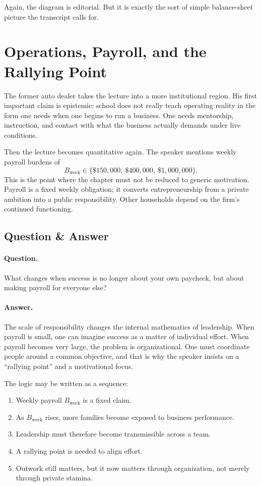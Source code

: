 Again, the diagram is editorial. But it is exactly the sort of simple balance-sheet picture the transcript calls for.

\section{Operations, Payroll, and the Rallying Point}

The former auto dealer takes the lecture into a more institutional region. His first important claim is epistemic: school does not really teach operating reality in the form one needs when one begins to run a business. One needs mentorship, instruction, and contact with what the business actually demands under live conditions.

Then the lecture becomes quantitative again. The speaker mentions weekly payroll burdens of
\begin{equation}
B_{\text{week}} \in \{\$150{,}000,\ \$400{,}000,\ \$1{,}000{,}000\}.
\end{equation}
This is the point where the chapter must not be reduced to generic motivation. Payroll is a fixed weekly obligation; it converts entrepreneurship from a private ambition into a public responsibility. Other households depend on the firm's continued functioning.

\subsection{Question \& Answer}

\paragraph{Question.} What changes when success is no longer about your own paycheck, but about making payroll for everyone else?

\paragraph{Answer.} The scale of responsibility changes the internal mathematics of leadership. When payroll is small, one can imagine success as a matter of individual effort. When payroll becomes very large, the problem is organizational. One must coordinate people around a common objective, and that is why the speaker insists on a ``rallying point'' and a motivational focus.

The logic may be written as a sequence:
\begin{enumerate}
\item Weekly payroll \(B_{\text{week}}\) is a fixed claim.
\item As \(B_{\text{week}}\) rises, more families become exposed to business performance.
\item Leadership must therefore become transmissible across a team.
\item A rallying point is needed to align effort.
\item Outwork still matters, but it now matters through organization, not merely through private stamina.
\end{enumerate}

